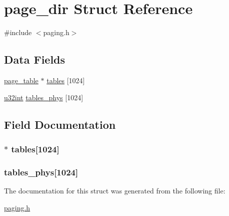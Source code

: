 \hypertarget{structpage__dir}{}\section{page\+\_\+dir Struct Reference}
\label{structpage__dir}


{\ttfamily \#include $<$paging.\+h$>$}

\subsection*{Data Fields}
\begin{DoxyCompactItemize}
\item 
\hyperlink{structpage__table}{page\+\_\+table} $\ast$ \hyperlink{structpage__dir_a3d121c0f2d5bf9079178a0889d26ae94}{tables} \mbox{[}1024\mbox{]}
\item 
\hyperlink{system_8h_a757de76cafbcddaac0d1632902fe4cb8}{u32int} \hyperlink{structpage__dir_a67d4c7f42d2b63673971e15ebabed897}{tables\+\_\+phys} \mbox{[}1024\mbox{]}
\end{DoxyCompactItemize}


\subsection{Field Documentation}
\hypertarget{structpage__dir_a3d121c0f2d5bf9079178a0889d26ae94}{}
\subsubsection[{tables}]{$\ast$ tables\mbox{[}1024\mbox{]}}\label{structpage__dir_a3d121c0f2d5bf9079178a0889d26ae94}
\hypertarget{structpage__dir_a67d4c7f42d2b63673971e15ebabed897}{}
\subsubsection[{tables\+\_\+phys}]{ tables\+\_\+phys\mbox{[}1024\mbox{]}}\label{structpage__dir_a67d4c7f42d2b63673971e15ebabed897}


The documentation for this struct was generated from the following file\+:\begin{DoxyCompactItemize}
\item 
\hyperlink{paging_8h}{paging.\+h}\end{DoxyCompactItemize}
